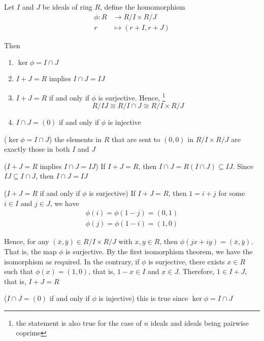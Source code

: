 \begin{proposition}
	Let $I$ and $J$ be ideals of ring $R$, define the homomorphism
	\begin{align*}
		\phi: R &\to R / I \times R / J \\
		r &\mapsto (r + I, r + J)
	\end{align*}
	
	Then
	\begin{enumerate}
		\item $\ker \phi = I \cap J$
		\item $I + J = R$ implies $I \cap J = IJ$
		\item $I + J = R$ if and only if $\phi$ is surjective. Hence, \footnote{the statement is also true for the case of $n$ ideals and ideals being pairwise coprime}
		$$
			R / IJ \cong R / I \cap J \cong R / I \times R / J
		$$
		\item $I \cap J = (0)$ if and only if $\phi$ is injective
	\end{enumerate}
\end{proposition}

\begin{longproof}
	($\ker \phi = I \cap J$) the elements in $R$ that are sent to $(0, 0)$ in $R / I \times R / J$ are exactly those in both $I$ and $J$
	
	($I + J = R$ implies $I \cap J = IJ$) If $I + J = R$, then $I \cap J = R(I \cap J) \subseteq IJ$. Since $IJ \subseteq I \cap J$, then $I \cap J = IJ$
	
	($I + J = R$ if and only if $\phi$ is surjective) If $I + J = R$, then $1 = i + j$ for some $i \in I$ and $j \in J$, we have
	\begin{align*}
		\phi(i) = \phi(1 - j) = (0, 1) \\
		\phi(j) = \phi(1 - i) = (1, 0)
	\end{align*}
	
	Hence, for any $(\bar{x}, \bar{y}) \in R / I \times R / J$ with $x, y \in R$, then $\phi(jx + iy) = (\bar{x}, \bar{y})$. That is, the map $\phi$ is surjective. By the first isomorphism theorem, we have the isomorphism as required. In the contrary, if $\phi$ is surjective, there exists $x \in R$ such that $\phi(x) = (1, 0)$, that is, $1 - x \in I$ and $x \in J$. Therefore, $1 \in I + J$, that is, $I + J = R$
	
	($I \cap J = (0)$ if and only if $\phi$ is injective) this is true since $\ker \phi = I \cap J$
\end{longproof}

